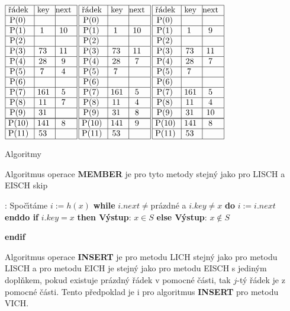 $\vbox {\hbox{\vtop{\offinterlineskip\halign{\strut\vrule\ # & \vrule\ # & \vrule\hfil # \hfil\vrule\cr\noalign{\hrule}\v r\'adek & key & next \hfil\cr\noalign{\hrule}P(0) & &\hfill \cr\noalign{\hrule}P(1) & 1 & 10 \cr\noalign{\hrule}P(2) & &\hfill \cr\noalign{\hrule}P(3) & 73 & 11 \cr\noalign{\hrule}P(4) & 28 & 9 \cr\noalign{\hrule}P(5) & 7 & 4 \cr\noalign{\hrule}P(6) &  &\hfill \cr\noalign{\hrule}P(7) & 161 & 5 \cr\noalign{\hrule}P(8) & 11 & 7 \cr\noalign{\hrule}P(9) & 31 &\hfill \cr\noalign{\hrule}\noalign{\hrule}P(10) & 141 & 8 \cr\noalign{\hrule}P(11) & 53 & \hfill \cr\noalign{\hrule}}}\,\vtop{\offinterlineskip\halign{\strut\vrule\ # & \vrule\ # & \vrule\hfil# \hfil\vrule\cr\noalign{\hrule}\v r\'adek & key & next \hfil\cr\noalign{\hrule}P(0) & &\hfill \cr\noalign{\hrule}P(1) & 1 & 10 \cr\noalign{\hrule}P(2) & &\hfill \cr\noalign{\hrule}P(3) & 73 & 11 \cr\noalign{\hrule}P(4) & 28 & 7 \cr\noalign{\hrule}P(5) & 7 & \hfill \cr\noalign{\hrule}P(6) &  &\hfill \cr\noalign{\hrule}P(7) & 161 & 5 \cr\noalign{\hrule}P(8) & 11 & 4 \cr\noalign{\hrule}P(9) & 31 & 8 \cr\noalign{\hrule}\noalign{\hrule}P(10) & 141 & 9 \cr\noalign{\hrule}P(11) & 53 & \hfill \cr\noalign{\hrule}}}\,\vtop{\offinterlineskip\halign {\strut\vrule\ # & \vrule\ # & \vrule \hfil # \hfil \vrule\cr\noalign{\hrule}\v r\'adek & key & next \hfil \cr\noalign{\hrule}P(0) & &\hfill \cr\noalign{\hrule}P(1) & 1 & 9 \cr\noalign{\hrule}P(2) & &\hfill \cr\noalign{\hrule}P(3) & 73 & 11 \cr\noalign{\hrule}P(4) & 28 & 7 \cr\noalign{\hrule}P(5) & 7 & \hfill \cr\noalign{\hrule}P(6) & & \hfill \cr\noalign{\hrule}P(7) & 161 & 5 \cr\noalign{\hrule}P(8) & 11 & 4  \cr\noalign{\hrule}P(9) & 31 & 10 \cr\noalign{\hrule}\noalign{\hrule}P(10) & 141 & 8 \cr\noalign{\hrule}P(11) & 53 & \hfill \cr\noalign{\hrule}}}}}$
\medskip

\subhead
Algoritmy
\endsubhead
\smallskip

\flushpar Algoritmus operace {\bf MEMBER} je pro tyto metody 
stejn\'y jako pro LISCH a EISCH
skip

:\newline 
Spo\v c\'\i t\'ame $i:=h\left(x\right)$\newline 
{\bf while} $i.next\ne$pr\'azdn\'e a $i.key\ne x$ {\bf do} $i:=i.
next$ {\bf enddo\newline 
if} $i.key=x$ {\bf then V\'ystup}: $x\in S$ {\bf else V\'ystup}: $
x\notin S$ {\bf endif
\medskip

}\flushpar Algoritmus operace {\bf INSERT} je pro metodu LICH stejn\'y 
jako pro metodu LISCH a pro metodu EICH je stejn\'y jako 
pro metodu EISCH s jedin\'ym dopl\v nkem, pokud existuje 
pr\'azdn\'y \v r\'adek v pomocn\'e \v c\'asti, tak $j$-t\'y \v r\'adek je z 
pomocn\'e \v c\'asti. Tento p\v redpoklad je i pro algoritmus 
{\bf INSERT} pro metodu VICH.
\medskip

